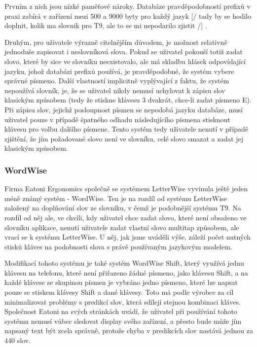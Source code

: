 \documentclass{article}
\begin{document}
Prvním z nich jsou nízké paměťové nároky. Databáze pravděpodobností prefixů v praxi zabírá v zařízení mezi 500 a 9000 byty pro každý jazyk 
[/ tady by se hodilo doplnit, kolik ma slovnik pro T9, ale to se mi nepodarilo zjistit /]
.  

Druhým, pro uživatele výrazně citelnějším důvodem, je možnost relativně jednoduše zapisovat i neslovníková slova. Pokud se uživatel pokouší totiž zadat slovo, které by sice ve slovníku neexistovalo, ale má skladbu hlásek odpovídající jazyku, jehož databázi prefixů používá, je pravděpodobné, že systém vybere správné písmeno. Další vlastností implicitně vyplývající z faktu, že systém nepoužívá slovník, je, že se uživatel nikdy nemusí uchylovat k zápisu slov klasickým způsobem (tedy že stiskne klávesu 3 dvakrát, chce-li zadat písmeno E). Při zápisu slov, jejichž posloupnost písmen se nepodobá jazyku databáze, musí uživatel pouze v případě špatného odhadu následujícího písmena stisknout klávesu pro volbu dalšího písmene. Tento systém tedy uživatele nenutí v případě zjištění, že jím požadované slovo není ve slovníku, celé slovo smazat a zadat jej klasickým způsobem. \cite{MacKenzie2001} \cite{Ghayoomi2009} 


\subsubsection{WordWise}

Firma Eatoni Ergonomics společně se systémem LetterWise vyvinula ještě jeden méně známý systém - WordWise. Ten je na rozdíl od systému LetterWise založený na doplňování slov ze slovníku, v čemž je podobnější systému T9. Na rozdíl od něj ale, ve chvíli, kdy uživatel chce zadat slovo, které není obsaženo ve slovníku aplikace, nenutí uživatele zadat vlastní slovo multitap způsobem, ale vrací se k systému LetterWise. U něj, jak jsme uváděli výše, záleží počet nutných stisků kláves na podobnosti slova s právě používaným jazykovým modelem. 

Modifikací tohoto systému je také systém WordWise Shift, který využívá jednu klávesu na telefonu, které není přiřazeno žádné písmeno, jako klávesu Shift, a na každé klávese se skupinou písmen je vybráno jedno písmeno, které lze napsat pouze se stiskem klávesy Shift a dané klávesy. Toto má podle výrobce za cíl minimalizovat problémy s predikcí slov, která sdílejí stejnou kombinaci kláves. Společnost Eatoni na svých stránkách uvádí, že uživatel při používání tohoto systému nemusí vůbec sledovat display svého zařízení, a přesto bude může jím napsaný text být zcela správně, protože chyba v predikcích slov nastává jednou za 440 slov. \cite{Ward2012} 
\end{document}
